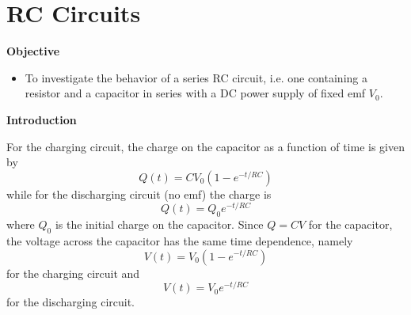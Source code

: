 \setcounter{equation}{0}

\section{RC Circuits}
\begin{comment}
This is an old version of an RC circuits lab.  This version is superceded by the new lab, written by Matt Trawick in 2015.  I have no idea who wrote this version or how old it is.

IMHO, everything is wrong with this lab.  It uses ancient analog voltmeters dating from the Hoover administration.  It uses the internal resistance of the meters as the ``R'' in the RC circuit.  It talks about ``half life'' of the circuit, which nobody ever uses in real life.  The new RC circuits lab covers basically the same ground but does it better.

May this lab rest in peace.
--Matt Trawick, March 2016
\end{comment}

\makelabheader %

\textbf{Objective}

\begin{itemize}
\item To investigate the behavior of a series RC circuit, i.e. one containing a resistor and a capacitor in series with a DC power supply of fixed emf $V_{0}$.
\end{itemize}
\textbf{Introduction} 

For the charging circuit, the charge on the capacitor as a function of time
is given by
\begin{equation}
Q(t)=CV_{0}\left(1-e^{-t/RC}\right)
\end{equation}
while for the discharging circuit (no emf) the charge is
\begin{equation}
Q(t)=Q_{0}e^{-t/RC}
\end{equation}
where $Q_{0}$ is the initial charge on the capacitor.  Since $Q=CV$ for the
capacitor, the voltage across the capacitor has the same time dependence,
namely
\begin{equation}
V(t)=V_{0}\left(1-e^{-t/RC}\right)
\end{equation}
for the charging circuit and
\begin{equation}
V(t)=V_{0}e^{-t/RC}
\end{equation}
for the discharging circuit.
\vspace{5mm}

